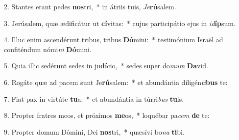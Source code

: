 2. Stantes erant pedes \textbf{nos}tri,~*  in átriis tuis, \textit{Je}\textbf{rú}salem.\

3. Jerúsalem, quæ ædificátur ut \textbf{cí}vitas:~*  cujus participátio ejus in \textit{id}\textbf{íp}sum.\

4. Illuc enim ascendérunt tribus, tribus \textbf{Dó}mini:~*  testimónium Israël ad confiténdum nómi\textit{ni} \textbf{Dó}mini.\

5. Quia illic sedérunt sedes in ju\textbf{dí}cio,~*  sedes super do\textit{mum} \textbf{Da}vid.\

6. Rogáte quæ ad pacem sunt Je\textbf{rú}salem:~*  et abundántia diligén\textit{ti}\textbf{bus} te:\

7. Fiat pax in virtúte \textbf{tu}a:~*  et abundántia in túrri\textit{bus} \textbf{tu}is.\

8. Propter fratres meos, et próximos \textbf{me}os,~*  loquébar pa\textit{cem} \textbf{de} te:\

9. Propter domum Dómini, Dei \textbf{nos}tri,~*  quæsívi bo\textit{na} \textbf{ti}bi.\

